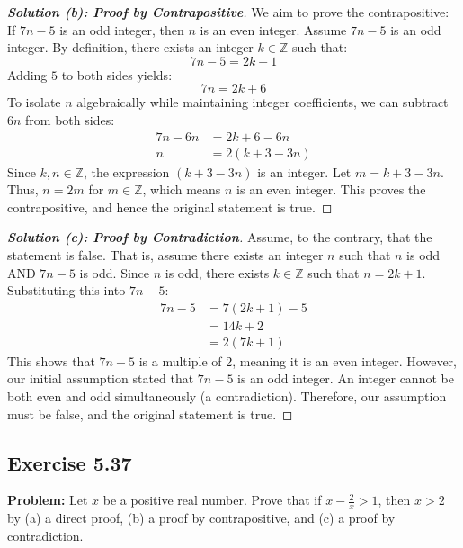 \documentclass[11pt, a4paper]{article}
\theoremstyle{definition}
\theoremstyle{remark}
\newcommand{\Z}{\mathbb{Z}}
\begin{document}
\begin{proof}[\textbf{Solution (b): Proof by Contrapositive}]
We aim to prove the contrapositive: If $7n - 5$ is an odd integer, then $n$ is an even integer. 
Assume $7n - 5$ is an odd integer. By definition, there exists an integer $k \in \Z$ such that:
\[ 7n - 5 = 2k + 1 \]
Adding $5$ to both sides yields:
\[ 7n = 2k + 6 \]
To isolate $n$ algebraically while maintaining integer coefficients, we can subtract $6n$ from both sides:
\begin{align*}
    7n - 6n &= 2k + 6 - 6n \\
    n &= 2(k + 3 - 3n)
\end{align*}
Since $k, n \in \Z$, the expression $(k + 3 - 3n)$ is an integer. Let $m = k + 3 - 3n$. Thus, $n = 2m$ for $m \in \Z$, which means $n$ is an even integer. This proves the contrapositive, and hence the original statement is true.
\end{proof}

\begin{proof}[\textbf{Solution (c): Proof by Contradiction}]
Assume, to the contrary, that the statement is false. That is, assume there exists an integer $n$ such that $n$ is odd AND $7n - 5$ is odd.
Since $n$ is odd, there exists $k \in \Z$ such that $n = 2k + 1$. Substituting this into $7n - 5$:
\begin{align*}
    7n - 5 &= 7(2k + 1) - 5 \\
           &= 14k + 2 \\
           &= 2(7k + 1)
\end{align*}
This shows that $7n - 5$ is a multiple of 2, meaning it is an even integer. However, our initial assumption stated that $7n - 5$ is an odd integer. An integer cannot be both even and odd simultaneously (a contradiction). Therefore, our assumption must be false, and the original statement is true.
\end{proof}

\subsection{Exercise 5.37}
\textbf{Problem:} Let $x$ be a positive real number. Prove that if $x - \frac{2}{x} > 1$, then $x > 2$ by (a) a direct proof, (b) a proof by contrapositive, and (c) a proof by contradiction.
\end{document}
